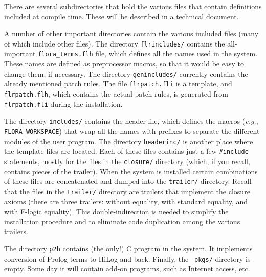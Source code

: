 \documentclass[11pt]{article}
\newcommand{\fl}{\mbox{F-logic}\xspace}
\begin{document}
There are several subdirectories that hold the various files that contain
definitions included at compile time. These will be described in a
technical document.

A number of other important directories contain the various included files
(many of which include other files). The directory {\tt flrincludes/}
contains the all-important {\tt flora\_terms.flh} file, which defines all
the names used in the system. These names are defined as preprocessor
macros, so that it would be easy to change them, if necessary.
The directory {\tt genincludes/} currently contains the already mentioned
patch rules. The file {\tt flrpatch.fli} is a template, and {\tt
  flrpatch.flh}, which contains the actual patch rules, is generated from
{\tt flrpatch.fli} during the installation.

The directory {\tt includes/} contains the header file, which defines the
macros ({\it e.g.}, {\tt FLORA\_WORKSPACE}) that wrap all the names with
prefixes to separate the different modules of the user program.  The
directory {\tt headerinc/} is another place where the template files are
located. Each of these files contains just a few {\tt \#include}
statements, mostly for the files in the {\tt closure/} directory (which, if
you recall, contains pieces of the trailer). When the system is installed
certain combinations of these files are concatenated and dumped into the
{\tt trailer/} directory. Recall that the files in the {\tt trailer/}
directory are trailers that implement the closure axioms (there are three
trailers: without equality, with standard equality, and with \fl equality).
This double-indirection is needed to simplify the installation procedure
and to eliminate code duplication among the various trailers.

The directory {\tt p2h} contains (the only!) C program in the system. It
implements conversion of Prolog terms to HiLog and back. Finally, the {\tt
  pkgs/} directory is empty. Some day it will contain add-on programs, such
as Internet access, etc.





\printindex
\end{document}
